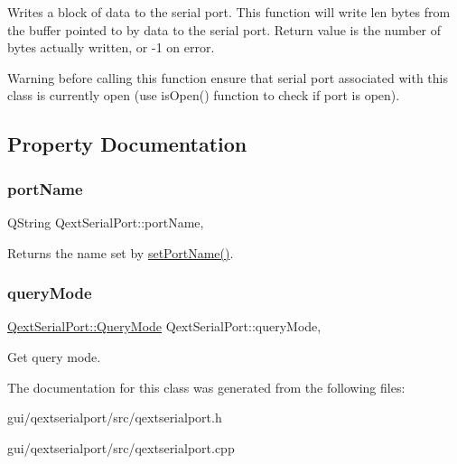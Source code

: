 Writes a block of data to the serial port. This function will write len bytes from the buffer pointed to by data to the serial port. Return value is the number of bytes actually written, or -\/1 on error.

\begin{DoxyWarning}{Warning}
before calling this function ensure that serial port associated with this class is currently open (use is\+Open() function to check if port is open). 
\end{DoxyWarning}


\subsection{Property Documentation}
\mbox{\label{classQextSerialPort_a989fbac088b18152af0b736a71b9155b}} 
\subsubsection{\texorpdfstring{port\+Name}{portName}}
{\footnotesize\ttfamily Q\+String Qext\+Serial\+Port\+::port\+Name\hspace{0.3cm}{\ttfamily [read]}, {\ttfamily [write]}}

Returns the name set by \hyperlink{classQextSerialPort_a9be0f083d807d93bcf30554a2a272d93}{set\+Port\+Name()}. \mbox{\label{classQextSerialPort_a22867092a82eb015ad6f84fd4ade1073}} 
\subsubsection{\texorpdfstring{query\+Mode}{queryMode}}
{\footnotesize\ttfamily \hyperlink{classQextSerialPort_a6002128d7351ea9a958d6a6d1fc6b9bd}{Qext\+Serial\+Port\+::\+Query\+Mode} Qext\+Serial\+Port\+::query\+Mode\hspace{0.3cm}{\ttfamily [read]}, {\ttfamily [write]}}

Get query mode. 

The documentation for this class was generated from the following files\+:\begin{DoxyCompactItemize}
\item 
gui/qextserialport/src/qextserialport.\+h\item 
gui/qextserialport/src/qextserialport.\+cpp\end{DoxyCompactItemize}
